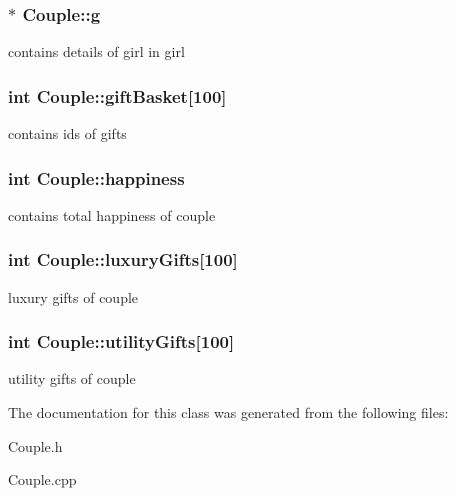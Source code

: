 \subsubsection[{\texorpdfstring{g}{g}}]{$\ast$ Couple\+::g}\hypertarget{classCouple_a025c86ed75a8b2482fcc3e98a84c39c1}{}\label{classCouple_a025c86ed75a8b2482fcc3e98a84c39c1}
contains details of girl in girl 
\subsubsection[{\texorpdfstring{gift\+Basket}{giftBasket}}]{\setlength{\rightskip}{0pt plus 5cm}int Couple\+::gift\+Basket\mbox{[}100\mbox{]}}\hypertarget{classCouple_a2080514dd79fa3bb90695fd295c02429}{}\label{classCouple_a2080514dd79fa3bb90695fd295c02429}
contains ids of gifts 
\subsubsection[{\texorpdfstring{happiness}{happiness}}]{\setlength{\rightskip}{0pt plus 5cm}int Couple\+::happiness}\hypertarget{classCouple_aee78d616688f0cccff84e1c23cb31f7a}{}\label{classCouple_aee78d616688f0cccff84e1c23cb31f7a}
contains total happiness of couple 
\subsubsection[{\texorpdfstring{luxury\+Gifts}{luxuryGifts}}]{\setlength{\rightskip}{0pt plus 5cm}int Couple\+::luxury\+Gifts\mbox{[}100\mbox{]}}\hypertarget{classCouple_a7b672637b9c901e1ffcbd27e13a7a57a}{}\label{classCouple_a7b672637b9c901e1ffcbd27e13a7a57a}
luxury gifts of couple 
\subsubsection[{\texorpdfstring{utility\+Gifts}{utilityGifts}}]{\setlength{\rightskip}{0pt plus 5cm}int Couple\+::utility\+Gifts\mbox{[}100\mbox{]}}\hypertarget{classCouple_ab88c6aeb8added9e52bd824e1cacb044}{}\label{classCouple_ab88c6aeb8added9e52bd824e1cacb044}
utility gifts of couple 

The documentation for this class was generated from the following files\+:\begin{DoxyCompactItemize}
\item 
Couple.\+h\item 
Couple.\+cpp\end{DoxyCompactItemize}
